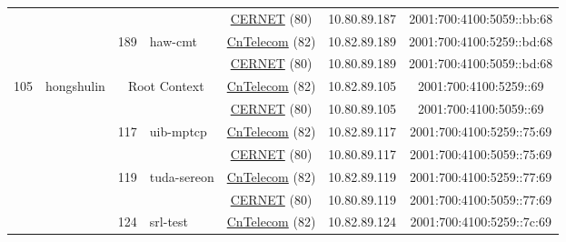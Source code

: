 \begin{small}
\begin{center}
\begin{longtable}{|c|c|c|c|c|c|c|c|}
  &  &  &  & \multicolumn{2}{|c|}{\tiny{\href{http://www.cernet.edu.cn}{CERNET} (80)}} & \tiny{10.80.89.187} & \tiny{2001:700:4100:5059::bb:68} \\* \cline{3-3}\cline{4-4}\cline{5-5}\cline{6-6}\cline{7-7}\cline{8-8}
  &  & \multirow{2}{*}{\tiny{189}} & \multicolumn{1}{|l|}{\multirow{2}{*}{\tiny{haw-cmt}}} & \multicolumn{2}{|c|}{\tiny{\href{http://www.chinatelecom.com.cn}{CnTelecom} (82)}} & \tiny{10.82.89.189} & \tiny{2001:700:4100:5259::bd:68} \\* \cline{5-5}\cline{6-6}\cline{7-7}\cline{8-8}
  &  &  &  & \multicolumn{2}{|c|}{\tiny{\href{http://www.cernet.edu.cn}{CERNET} (80)}} & \tiny{10.80.89.189} & \tiny{2001:700:4100:5059::bd:68} \\ \hline
 \multirow{38}{*}{\tiny{105}} & \multicolumn{1}{|l|}{\multirow{38}{*}{\tiny{hongshulin}}} & \multicolumn{2}{|c|}{\multirow{2}{*}{\tiny{Root Context}}} & \multicolumn{2}{|c|}{\tiny{\href{http://www.chinatelecom.com.cn}{CnTelecom} (82)}} & \tiny{10.82.89.105} & \tiny{2001:700:4100:5259::69} \\* \cline{5-5}\cline{6-6}\cline{7-7}\cline{8-8}
  &  & \multicolumn{2}{|c|}{} & \multicolumn{2}{|c|}{\tiny{\href{http://www.cernet.edu.cn}{CERNET} (80)}} & \tiny{10.80.89.105} & \tiny{2001:700:4100:5059::69} \\* \cline{3-3}\cline{4-4}\cline{5-5}\cline{6-6}\cline{7-7}\cline{8-8}
  &  & \multirow{2}{*}{\tiny{117}} & \multicolumn{1}{|l|}{\multirow{2}{*}{\tiny{uib-mptcp}}} & \multicolumn{2}{|c|}{\tiny{\href{http://www.chinatelecom.com.cn}{CnTelecom} (82)}} & \tiny{10.82.89.117} & \tiny{2001:700:4100:5259::75:69} \\* \cline{5-5}\cline{6-6}\cline{7-7}\cline{8-8}
  &  &  &  & \multicolumn{2}{|c|}{\tiny{\href{http://www.cernet.edu.cn}{CERNET} (80)}} & \tiny{10.80.89.117} & \tiny{2001:700:4100:5059::75:69} \\* \cline{3-3}\cline{4-4}\cline{5-5}\cline{6-6}\cline{7-7}\cline{8-8}
  &  & \multirow{2}{*}{\tiny{119}} & \multicolumn{1}{|l|}{\multirow{2}{*}{\tiny{tuda-sereon}}} & \multicolumn{2}{|c|}{\tiny{\href{http://www.chinatelecom.com.cn}{CnTelecom} (82)}} & \tiny{10.82.89.119} & \tiny{2001:700:4100:5259::77:69} \\* \cline{5-5}\cline{6-6}\cline{7-7}\cline{8-8}
  &  &  &  & \multicolumn{2}{|c|}{\tiny{\href{http://www.cernet.edu.cn}{CERNET} (80)}} & \tiny{10.80.89.119} & \tiny{2001:700:4100:5059::77:69} \\* \cline{3-3}\cline{4-4}\cline{5-5}\cline{6-6}\cline{7-7}\cline{8-8}
  &  & \multirow{2}{*}{\tiny{124}} & \multicolumn{1}{|l|}{\multirow{2}{*}{\tiny{srl-test}}} & \multicolumn{2}{|c|}{\tiny{\href{http://www.chinatelecom.com.cn}{CnTelecom} (82)}} & \tiny{10.82.89.124} & \tiny{2001:700:4100:5259::7c:69} \\* \cline{5-5}\cline{6-6}\cline{7-7}\cline{8-8}

\end{longtable}
\end{center}
\end{small}

